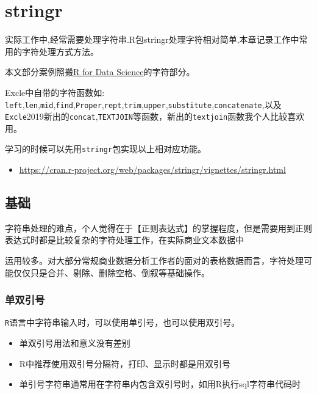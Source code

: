 \documentclass[
]{book}
\providecommand{\tightlist}{%
  \setlength{\itemsep}{0pt}\setlength{\parskip}{0pt}}
\begin{document}
\hypertarget{stringr}{%
\chapter{stringr}\label{stringr}}

实际工作中,经常需要处理字符串.R包stringr处理字符相对简单,本章记录工作中常用的字符处理方式方法。

本文部分案例照搬\href{https://r4ds.had.co.nz/strings.html}{R for Data Science}的字符部分。

Excle中自带的字符函数如: \texttt{left},\texttt{len},\texttt{mid},\texttt{find},\texttt{Proper},\texttt{rept},\texttt{trim},\texttt{upper},\texttt{substitute},\texttt{concatenate},以及\texttt{Excle}2019新出的\texttt{concat},\texttt{TEXTJOIN}等函数，新出的\texttt{textjoin}函数我个人比较喜欢用。

学习的时候可以先用\texttt{stringr}包实现以上相对应功能。

\begin{itemize}
\tightlist
\item
  \url{https://cran.r-project.org/web/packages/stringr/vignettes/stringr.html}
\end{itemize}

\hypertarget{ux57faux7840}{%
\section{基础}\label{ux57faux7840}}

字符串处理的难点，个人觉得在于【正则表达式】的掌握程度，但是需要用到正则表达式时都是比较复杂的字符处理工作，在实际商业文本数据中

运用较多。对大部分常规商业数据分析工作者的面对的表格数据而言，字符处理可能仅仅只是合并、剔除、删除空格、倒叙等基础操作。

\hypertarget{ux5355ux53ccux5f15ux53f7}{%
\subsection{单双引号}\label{ux5355ux53ccux5f15ux53f7}}

\texttt{R}语言中字符串输入时，可以使用单引号，也可以使用双引号。

\begin{itemize}
\item
  单双引号用法和意义没有差别
\item
  R中推荐使用双引号分隔符，打印、显示时都是用双引号
\item
  单引号字符串通常用在字符串内包含双引号时，如用R执行sql字符串代码时
\end{itemize}
\end{document}
